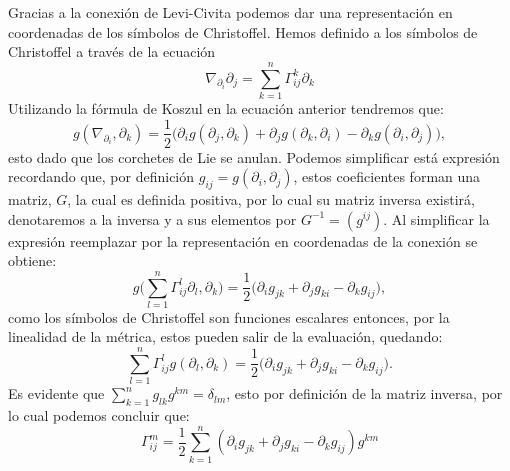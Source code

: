 Gracias a la conexión de Levi-Civita podemos dar una representación en coordenadas de los símbolos de Christoffel. Hemos definido a los símbolos de Christoffel a través de la ecuación
\[
	\nabla_{\partial_{i}} \partial_{j} = \sum_{k=1}^{n} \Gamma_{ij}^{k} \partial_{k}
\]
Utilizando la fórmula de Koszul en la ecuación anterior tendremos que:
\[
	g(\nabla_{\partial_{i}}, \partial_{k}) = \frac{1}{2} \biggl(\partial_{i}g(\partial_{j},\partial_{k}) + \partial_{j}g(\partial_{k},\partial_{i}) - \partial_{k}g(\partial_{i},\partial_{j})\biggr),
\]
esto dado que los corchetes de Lie se anulan. Podemos simplificar está expresión recordando que, por definición $g_{ij} = g(\partial_{i}, \partial_{j})$, estos coeficientes forman una matriz, $G$, la cual es definida positiva, por lo cual su matriz inversa existirá, denotaremos a la inversa y a sus elementos por $G^{-1}=(g^{ij})$. Al simplificar la expresión reemplazar por la representación en coordenadas de la conexión se obtiene:
\[
  g\biggl(\sum_{l=1}^{n} \Gamma^{l}_{ij}\partial_{l}, \partial_{k}\biggr) = \frac{1}{2} \biggl( \partial_{i}g_{jk} + \partial_{j}g_{ki} - \partial_{k}g_{ij}\biggr),
\]
como los símbolos de Christoffel son funciones escalares entonces, por la linealidad de la métrica, estos pueden salir de la evaluación, quedando:
\[
	\sum_{l=1}^{n} \Gamma^{l}_{ij} g(\partial_{l}, \partial_{k}) = \frac{1}{2} \biggl( \partial_{i}g_{jk} + \partial_{j}g_{ki} - \partial_{k}g_{ij}\biggr).
\]
Es evidente que $\sum_{k=1}^{n}g_{lk}g^{km} = \delta_{lm}$, esto por definición de la matriz inversa, por lo cual podemos concluir que:
\[
  \Gamma_{ij}^{m} = \frac{1}{2}\sum_{k=1}^{n} (\partial_{i}g_{jk} + \partial_{j}g_{ki} - \partial_{k}g_{ij})g^{km}
\]

